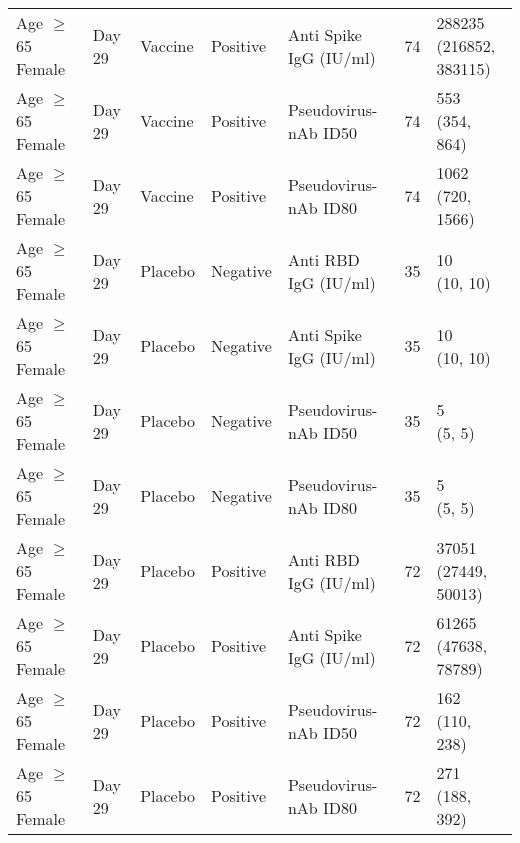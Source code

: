 \documentclass[]{book}
\theoremstyle{definition}
\theoremstyle{definition}
\theoremstyle{definition}
\newcommand{\1}{\mathbbm{1}}
\begin{document}
\begin{landscape}
\begin{ThreePartTable}
\begin{longtable}[t]{>{\raggedright\arraybackslash}p{7cm}llllll}
\hspace{1em}Age $\geq$ 65 Female & Day 29 & Vaccine & Positive & Anti Spike IgG (IU/ml) & 74 & \makecell[l]{288235\\(216852, 383115)}\\
\hspace{1em}Age $\geq$ 65 Female & Day 29 & Vaccine & Positive & Pseudovirus-nAb ID50 & 74 & \makecell[l]{553\\(354, 864)}\\
\hspace{1em}Age $\geq$ 65 Female & Day 29 & Vaccine & Positive & Pseudovirus-nAb ID80 & 74 & \makecell[l]{1062\\(720, 1566)}\\
\hspace{1em}Age $\geq$ 65 Female & Day 29 & Placebo & Negative & Anti RBD IgG (IU/ml) & 35 & \makecell[l]{10\\(10, 10)}\\
\hspace{1em}Age $\geq$ 65 Female & Day 29 & Placebo & Negative & Anti Spike IgG (IU/ml) & 35 & \makecell[l]{10\\(10, 10)}\\
\hspace{1em}Age $\geq$ 65 Female & Day 29 & Placebo & Negative & Pseudovirus-nAb ID50 & 35 & \makecell[l]{5\\(5, 5)}\\
\hspace{1em}Age $\geq$ 65 Female & Day 29 & Placebo & Negative & Pseudovirus-nAb ID80 & 35 & \makecell[l]{5\\(5, 5)}\\
\hspace{1em}Age $\geq$ 65 Female & Day 29 & Placebo & Positive & Anti RBD IgG (IU/ml) & 72 & \makecell[l]{37051\\(27449, 50013)}\\
\hspace{1em}Age $\geq$ 65 Female & Day 29 & Placebo & Positive & Anti Spike IgG (IU/ml) & 72 & \makecell[l]{61265\\(47638, 78789)}\\
\hspace{1em}Age $\geq$ 65 Female & Day 29 & Placebo & Positive & Pseudovirus-nAb ID50 & 72 & \makecell[l]{162\\(110, 238)}\\
\hspace{1em}Age $\geq$ 65 Female & Day 29 & Placebo & Positive & Pseudovirus-nAb ID80 & 72 & \makecell[l]{271\\(188, 392)}\\

\end{longtable}
\end{ThreePartTable}
\end{landscape}
\end{document}
